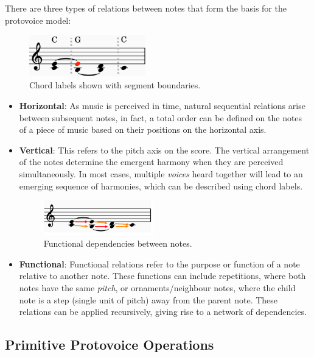 \documentclass[12pt,a4paper,twoside,openright]{report} \usepackage[pdfborder={0 0 0}]{hyperref}    %
\theoremstyle{definition} \newtheorem{definition}{Definition}[section]
\begin{document}
There are three types of relations between notes that form the basis for the protovoice model:

\begin{figure}[h] \centering \includegraphics[width=0.45\textwidth]{prep/cadenceharmony}
  \captionsetup{width=.9\linewidth} \caption{Chord labels shown with segment boundaries.} \label{fig:cadenceHarmony}
  \end{figure} \begin{itemize} \item \textbf{Horizontal}: As music is perceived in time, natural sequential relations
  arise between subsequent notes, in fact, a total order can be defined on the notes of a piece of music based on their
  positions on the horizontal axis. \item \textbf{Vertical}: This refers to the pitch axis on the score. The vertical
  arrangement of the notes determine the emergent harmony when they are perceived simultaneously. In most cases,
  multiple \textit{voices} heard together will lead to an emerging sequence of harmonies, which can be described using
  chord labels.

  \begin{figure}[h] \centering \includegraphics[width=0.45\textwidth]{prep/cadencefunctions}
  \captionsetup{width=.9\linewidth} \caption{Functional dependencies between notes.} \label{fig:cadenceFunctions}
\end{figure} \item \textbf{Functional}: Functional relations refer to the purpose or function of a note relative to
another note. These functions can include repetitions, where both notes have the same \textit{pitch}, or
ornaments/neighbour notes, where the child note is a step (single unit of pitch) away from the parent note. These
relations can be applied recursively, giving rise to a network of dependencies.

\end{itemize}

\FloatBarrier \subsection{Primitive Protovoice Operations} %
\end{document}
